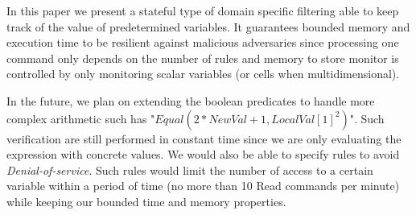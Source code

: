 In this paper we present a stateful type of domain specific filtering able to
keep track of the value of predetermined variables.
It guarantees bounded memory and execution time to be resilient against
malicious adversaries since processing one command only depends on the number of
rules and memory to store monitor is controlled by only monitoring scalar
variables (or cells when multidimensional).

In the future, we plan on extending the boolean predicates to handle more
complex arithmetic such has "$Equal(2*NewVal+1, LocalVal[1]^2)$".
Such verification are still performed in constant time since we are only
evaluating the expression with concrete values.
We would also be able to specify rules to avoid {\em Denial-of-service}.
Such rules would limit the number of access to a certain variable within a
period of time (\eg no more than 10 Read commands per minute) while keeping
our bounded time and memory properties.
